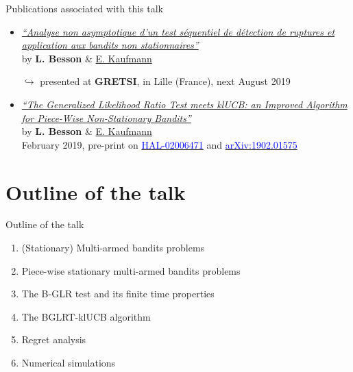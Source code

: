 \documentclass[11pt,english,ignorenonframetext,]{beamer}
\begin{document}
\begin{frame}{Publications associated with this talk}

  \begin{itemize}
    \item
      \href{https://hal.inria.fr/hal-02006471/document}{\emph{``Analyse non asymptotique d'un test séquentiel de détection de ruptures et application aux bandits non stationnaires''}}\\
      by \textbf{L. Besson} \&
      \href{http://chercheurs.lille.inria.fr/ekaufman/research.html}{E.
      Kaufmann}

      $\hookrightarrow$ presented at
      \textbf{GRETSI}, in Lille (France), next August 2019

    \vspace*{30pt}

    \item
      \href{https://hal.inria.fr/hal-02006471/document}{\emph{``The Generalized Likelihood Ratio Test meets klUCB: an Improved Algorithm for Piece-Wise Non-Stationary Bandits''}}\\
      by \textbf{L. Besson} \&
      \href{http://chercheurs.lille.inria.fr/ekaufman/research.html}{E.
      Kaufmann}\\
      February 2019,
      pre-print on
      \href{https://hal.inria.fr/hal-02006471}{\textcolor{blue}{HAL-02006471}}
      and
      \href{https://arxiv.org/abs/1902.01575}{\textcolor{blue}{arXiv:1902.01575}}

  \end{itemize}

\end{frame}


\section{\hfill{}Outline of the talk\hfill{}}

\begin{frame}{Outline of the talk}

  \begin{enumerate}
    \item
      (Stationary) Multi-armed bandits problems
    \vspace*{15pt}

    \item
      Piece-wise stationary multi-armed bandits problems
    \vspace*{15pt}

    \item
      The B-GLR test and its finite time properties
    \vspace*{15pt}

    \item
      The BGLRT-klUCB algorithm
    \vspace*{15pt}

    \item
      Regret analysis
    \vspace*{15pt}

    \item
      Numerical simulations
  \end{enumerate}

\end{frame}
\end{document}
